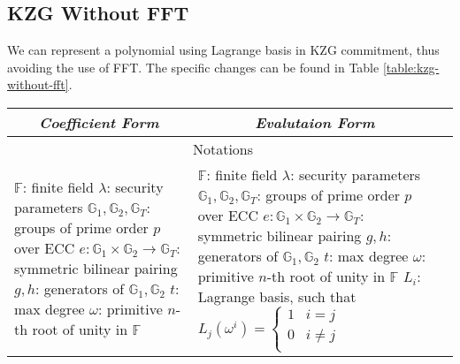\subsection{KZG Without FFT}

We can represent a polynomial using Lagrange basis in KZG commitment, thus avoiding the use of FFT. The specific changes can be found in Table \ref{table:kzg-without-fft}.

\begin{table}[!htp]
    \centering
    \begin{tabularx}{\textwidth}{|X|X|X|}
        \hline
        \multicolumn{1}{|c|}{\emph{Coefficient Form}} & \multicolumn{1}{c|}{\emph{Evalutaion Form}} \\ \hline
        \multicolumn{2}{|c|}{Notations} \\ \hline
        $\mathbb{F}$: finite field \newline
        $\lambda$: security parameters \newline
        $\mathbb{G}_1,\mathbb{G}_2,\mathbb{G}_T$: groups of prime order $p$ over ECC \newline
        $e \colon \mathbb{G}_1 \times \mathbb{G}_2 \to \mathbb{G}_T$: symmetric bilinear pairing \newline
        $g,h$: generators of $\mathbb{G}_1,\mathbb{G}_2$ \newline
        $t$: max degree \newline
        $\omega$: primitive $n$-th root of unity in $\mathbb{F}$ \newline
        &
        $\mathbb{F}$: finite field \newline
        $\lambda$: security parameters \newline
        $\mathbb{G}_1,\mathbb{G}_2,\mathbb{G}_T$: groups of prime order $p$ over ECC \newline
        $e \colon \mathbb{G}_1 \times \mathbb{G}_2 \to \mathbb{G}_T$: symmetric bilinear pairing \newline
        $g,h$: generators of $\mathbb{G}_1,\mathbb{G}_2$ \newline
        $t$: max degree \newline
        $\omega$: primitive $n$-th root of unity in $\mathbb{F}$ \newline
        $L_i$: Lagrange basis, such that $L_j(\omega^i)=\begin{cases}
            1 & i=j \\
            0 & i \ne j \\
        \end{cases}$ \\ \hline

\end{tabularx}
\end{table}
